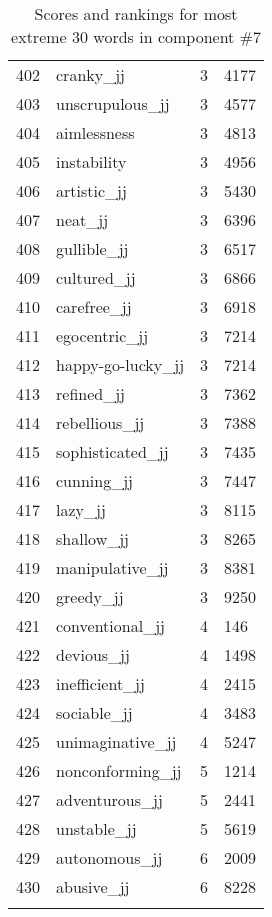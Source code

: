 \begin{longtable}[!htbp]{| rlr@{.}l |}
    402 & cranky\_jj & 3 & 4177 \\
    403 & unscrupulous\_jj & 3 & 4577 \\
    404 & aimlessness & 3 & 4813 \\
    405 & instability & 3 & 4956 \\
    406 & artistic\_jj & 3 & 5430 \\
    407 & neat\_jj & 3 & 6396 \\
    408 & gullible\_jj & 3 & 6517 \\
    409 & cultured\_jj & 3 & 6866 \\
    410 & carefree\_jj & 3 & 6918 \\
    411 & egocentric\_jj & 3 & 7214 \\
    412 & happy-go-lucky\_jj & 3 & 7214 \\
    413 & refined\_jj & 3 & 7362 \\
    414 & rebellious\_jj & 3 & 7388 \\
    415 & sophisticated\_jj & 3 & 7435 \\
    416 & cunning\_jj & 3 & 7447 \\
    417 & lazy\_jj & 3 & 8115 \\
    418 & shallow\_jj & 3 & 8265 \\
    419 & manipulative\_jj & 3 & 8381 \\
    420 & greedy\_jj & 3 & 9250 \\
    421 & conventional\_jj & 4 & 146 \\
    422 & devious\_jj & 4 & 1498 \\
    423 & inefficient\_jj & 4 & 2415 \\
    424 & sociable\_jj & 4 & 3483 \\
    425 & unimaginative\_jj & 4 & 5247 \\
    426 & nonconforming\_jj & 5 & 1214 \\
    427 & adventurous\_jj & 5 & 2441 \\
    428 & unstable\_jj & 5 & 5619 \\
    429 & autonomous\_jj & 6 & 2009 \\
    430 & abusive\_jj & 6 & 8228 \\
    \hline
    \caption{Scores and rankings for most extreme 30 words in component \#7} \\
\end{longtable}
